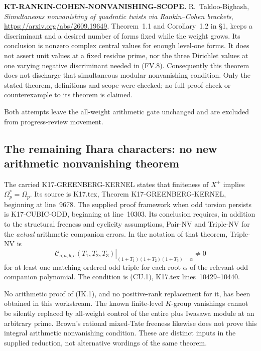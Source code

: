 \documentclass[11pt,a4paper]{article}
\theoremstyle{definition}
\renewcommand{\paragraph}[1]{\par\smallskip\noindent\textbf{#1}\quad\ignorespaces}
\begin{document}
\paragraph{KT-RANKIN-COHEN-NONVANISHING-SCOPE.}
R.~Takloo-Bighash, \emph{Simultaneous nonvanishing of
quadratic twists via Rankin--Cohen brackets},
\url{https://arxiv.org/abs/2609.19649}, Theorem~1.1 and
Corollary~1.2 in \S1, keeps a discriminant and a desired
number of forms fixed while the weight grows. Its
conclusion is nonzero complex central values for enough
level-one forms. It does not assert unit values at a
fixed residue prime, nor the three Dirichlet values at
one varying negative discriminant needed in (FV.8).
Consequently this theorem does not discharge that
simultaneous modular nonvanishing condition. Only the
stated theorem, definitions and scope were checked;
no full proof check or counterexample to its theorem
is claimed.

Both attempts leave the all-weight arithmetic gate
unchanged and are excluded from progress-review movement.



\subsection{The remaining Ihara characters: no new arithmetic
nonvanishing theorem}
\label{sec:kt-ihara-gate}

The carried K17-GREENBERG-KERNEL states that finiteness of
$X^+$ implies $\Omega_p^*=\Omega_p$. Its source is
K17.tex, Theorem K17-GREENBERG-KERNEL, beginning at
line~9678. The supplied proof framework when odd torsion
persists is K17-CUBIC-ODD, beginning at line~10303.
Its conclusion requires, in addition to the structural
freeness and cyclicity assumptions, Pair-NV and Triple-NV
for the \emph{actual} arithmetic companion errors.
In the notation of that theorem, Triple-NV is
\[
 \left.
 \mathcal C_{o;a,b,c}(T_1,T_2,T_3)
 \right|_{(1+T_1)(1+T_2)(1+T_3)=\alpha}\ne0
                                                               \tag{IK.1}
\]
for at least one matching ordered odd triple for each root
$\alpha$ of the relevant odd companion polynomial.
The condition is (CU.1), K17.tex lines~10429--10440.

No arithmetic proof of (IK.1), and no positive-rank
replacement for it, has been obtained in this workstream.
The known finite-level $K$-group vanishings cannot be
silently replaced by all-weight control of the entire
plus Iwasawa module at an arbitrary prime. Brown's rational
mixed-Tate freeness likewise does not prove this integral
arithmetic nonvanishing condition. These are distinct
inputs in the supplied reduction, not alternative wordings
of the same theorem.
\end{document}

